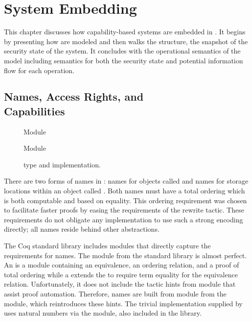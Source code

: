 \chapter{System Embedding}
\label{ch:embed}

This chapter discusses how capability-based systems are embedded in \TMmodelName{}.
It begins by presenting how  \TMcaps{} are modeled and then walks the \TMsystemState{} structure, the snapshot of the security state of the system.
It concludes with the operational semantics of the model including semantics for both the security state and potential information flow for each operation.

\section[Names, Access Rights, and Capabilities]{Names, Access Rights, and \\ Capabilities}

\begin{figure}
  \COQReferences{} Module
  
  \COQDOCReferences{}
  
  \vspace{10 mm}
  
  \COQReferencesImpl{} Module 
  
  \COQDOCReferencesImpl{} 
  \caption{\xmakefirstuc{\TMrefs{}} type and implementation.\label{fig:embed:references} \label{fig:embed:indices}}
\end{figure}

There are two forms of names in \TMmodelName{}: names for objects called \term{\TMrefs{}} and names for storage locations within an object called \term{\TMidxs{}}.
Both names must have a total ordering which is both computable and based on equality.
This ordering requirement was chosen to facilitate faster proofs by easing the requirements of the rewrite tactic.
These requirements do not obligate any implementation to use such a strong encoding directly; all names reside behind other abstractions.

The Coq standard library includes modules that directly capture the requirements for names.
The \COQUsualOrderedType{} module from the \COQOrderedTypeEx{} standard library is almost perfect.
An \COQOrderedType{} is a module containing an equivalence, an ordering relation, and a proof of total ordering while a \COQUsualOrderedType{} extends the \COQOrderedType{} to require term equality for the equivalence relation.
Unfortunately, it does not include the tactic hints from \COQOrderedType{} module that assist proof automation.
Therefore, names are built from \COQUsualOrderedTypeWithHints{} module from the \COQOrderedInclude{} module, which reintroduces these hints.
The trivial implementation supplied by \TMmodelName{} uses natural numbers via the \COQNatAsOT{} module, also included in the \COQOrderedTypeEx{} library.

